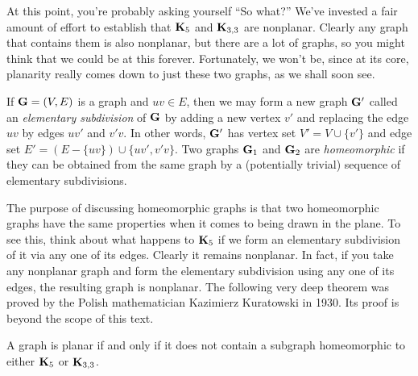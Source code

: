 At this point, you're probably asking yourself ``So what?'' We've
invested a fair amount of effort to establish that $\mathbf{K}_5$ and
$\mathbf{K}_{3,3}$ are nonplanar. Clearly any graph that contains them is
also nonplanar, but there are a lot of graphs, so you might think that
we could be at this forever. Fortunately, we won't be, since at its
core, planarity really comes down to just these two graphs, as we
shall soon see.

If $\mathbf{G}=(V,E)$ is a graph and $uv\in E$, then we may form a new graph
$\mathbf{G}'$ called an \textit{elementary subdivision} of $\mathbf{G}$ by adding
a new vertex $v'$ and replacing the edge $uv$ by edges $uv'$ and
$v'v$. In other words, $\mathbf{G}'$ has vertex set $V'=V\cup\{v'\}$ and
edge set $E'=(E-\{uv\})\cup \{uv',v'v\}$. Two graphs $\mathbf{G}_1$ and
$\mathbf{G}_2$ are \emph{homeomorphic} if they can be obtained from the same
graph by a (potentially trivial) sequence of elementary subdivisions.

The purpose of discussing homeomorphic graphs is that two homeomorphic
graphs have the same properties when it comes to being drawn in the
plane. To see this, think about what happens to $\mathbf{K}_5$ if we form an
elementary subdivision of it via any one of its edges.  Clearly it
remains nonplanar. In fact, if you take any nonplanar graph and form
the elementary subdivision using any one of its edges, the resulting
graph is nonplanar. The following very deep theorem was proved by the
Polish mathematician Kazimierz Kuratowski in 1930. Its proof is beyond
the scope of this text.

\begin{theorem}[Kuratowski]\label{thm:kuratowski}
  A graph is planar if and only if it does not contain a subgraph
  homeomorphic to either $\mathbf{K}_5$ or $\mathbf{K}_{3,3}$.
\end{theorem}

